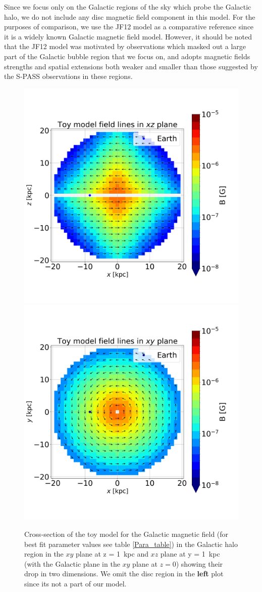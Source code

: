 \documentclass[usenatbib]{mnras}
\begin{document}
Since we focus only on the Galactic regions of the sky which probe the Galactic halo, we do not include any disc magnetic field component in this model. For the purposes of comparison, we use the JF12 model as a comparative reference since it is a widely known Galactic magnetic field model.
However, it should be noted that the JF12 model was motivated by observations which masked out a large part of the Galactic bubble region that we focus on, and adopts magnetic fields strengths and spatial extensions both weaker and smaller than those suggested by the S-PASS observations \citep{Carretti_2013} in these regions.

\begin{figure}
\centering
\includegraphics[width = 0.49\linewidth]{Images/ToyModel_BestFit_XZ.png}%
\includegraphics[width = 0.49\linewidth]{Images/ToyModel_BestFit_XY.png}
\caption{Cross-section of the toy model  for the Galactic magnetic field (for best fit parameter values see table \ref{Para_table}) in the Galactic halo region in the $xy$ plane at z = 1~kpc and $xz$ plane at y = 1~kpc (with the Galactic plane in the $xy$ plane at $z=0$) showing their drop in two dimensions. We omit the disc region in the \textbf{left} plot since its not a part of our model.}
\label{fig:Vis_TM}
\end{figure}
\end{document}

